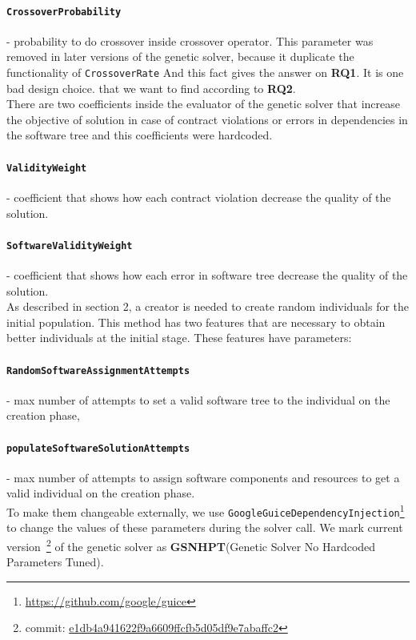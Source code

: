 	 \paragraph{\texttt{CrossoverProbability}} - probability to do crossover inside crossover operator. This parameter was removed in later versions of the genetic solver, because it duplicate the functionality of \texttt{CrossoverRate} And this fact gives the answer on \textbf{RQ1}. It is one bad design choice. that we want to find according to \textbf{RQ2}.\\
	 

There are two coefficients inside the evaluator of the genetic solver that increase the objective of solution in case of contract violations or errors in dependencies in the software tree and this coefficients were hardcoded.
	 \paragraph{\texttt{ValidityWeight}} - coefficient that shows how each contract violation decrease the quality of the solution.
	 \paragraph{\texttt{SoftwareValidityWeight}} - coefficient that shows how each error in software tree decrease the quality of the solution.\\
	 
As described in section 2, a creator is needed to create random individuals for the initial population.
This method has two features that are necessary to obtain better individuals at the initial stage. These features have parameters:
	 \paragraph{\texttt{RandomSoftwareAssignmentAttempts}} - max number of attempts to set a valid software tree to the individual on the creation phase,
	 \paragraph{\texttt{populateSoftwareSolutionAttempts}} -  max number of attempts to assign software components and resources to get a valid individual on the creation phase.\\

To make them changeable externally, we use \texttt{GoogleGuiceDependencyInjection}\footnote{\url{https://github.com/google/guice}} to change the values of these parameters during the solver call.
We mark current version~\footnote{commit: \href{https://git-st.inf.tu-dresden.de/mquat/mquat2/commit/e1db4a941622f9a6609ffcfb5d05df9e7abaffc2}{e1db4a941622f9a6609ffcfb5d05df9e7abaffc2}} of the genetic solver as \textbf{GSNHPT}(Genetic Solver No Hardcoded Parameters Tuned).


